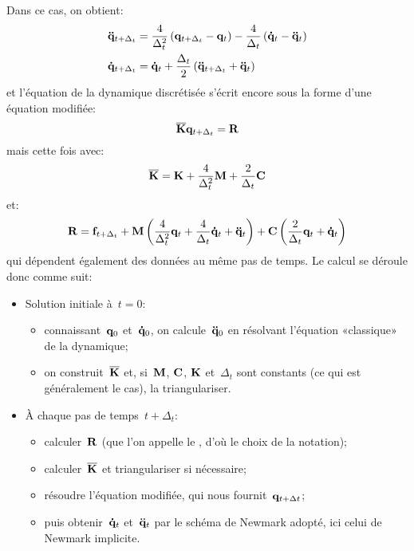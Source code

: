 Dans ce cas, on obtient:
\begin{equation}\colorgreen
\begin{aligned}
&\VV{\ddot q}_{t+\Delta_t} = \frac4{\Delta_t^2} \left( \VV{q}_{t+\Delta_t} -\VV{q}_t\right)
-\frac4{\Delta_t}\left( \VV{\dot q}_t - \VV{\ddot q}_t\right)\\
&\VV{\dot q}_{t+\Delta_t} = \VV{\dot q}_t + \frac{\Delta_t}2\left( \VV{\ddot q}_{t+\Delta_t} + \VV{\ddot q}_t\right)
\end{aligned}
\end{equation}
et l'équation de la dynamique discrétisée s'écrit encore sous la forme d'une équation modifiée:
\begin{equation}\colorblue
\MM{\overline{K}} \VV{q}_{t+\Delta_t} = \VV{R}
\end{equation}
mais cette fois avec:
\begin{equation}\colorgreen
\MM{\overline{K}} = \MM{K}+\frac4{\Delta_t^2}\MM{M}+\frac2{\Delta_t}\MM{C}
\end{equation}
et:
\begin{equation}\colorgreen
\VV{R} = \VV{f}_{t+\Delta_t} + \MM{M}\left(\frac4{\Delta_t^2}\VV{q}_t + \frac4{\Delta_t}\VV{\dot q}_t
+ \VV{\ddot q}_t\right)
+\MM{C}\left( \frac2{\Delta_t}\VV{q}_t + \VV{\dot q}_t\right)
\end{equation}
qui dépendent également des données au même pas de temps.
\medskip
Le calcul se déroule donc comme suit:
\begin{itemize}
  \item Solution initiale à~$t=0$:
	\begin{itemize}
	\item connaissant~$\VV{q}_0$ et~$\VV{\dot q}_0$, on calcule~$\VV{\ddot q}_0$ en résolvant
	l'équation «classique» de la dynamique;
	\item on construit~$\MM{\overline{K}}$ et, si~$\MM{M}$, $\MM{C}$, $\MM{K}$ et~$\Delta_t$ sont constants
	(ce qui est généralement le cas), la triangulariser.
	\end{itemize}
  \item À chaque pas de temps~$t+\Delta_t$:
	\begin{itemize}
	\item calculer~$\VV{R}$ (que l'on appelle le , d'où le choix de la notation);
	\item calculer~$\MM{\overline{K}}$ et triangulariser si nécessaire;
	\item résoudre l'équation modifiée, qui nous fournit~$\VV{q}_{t+\Delta t}$;
	\item puis obtenir~$\VV{\dot q}_t$ et~$\VV{\ddot q}_t$ par le schéma de Newmark adopté,
	ici celui de Newmark implicite.
	\end{itemize}
\end{itemize}
